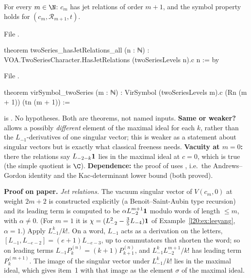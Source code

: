 \begin{theorem}\label{l20:thm:virinputs}
For every $m\in\N$: $c_m$ has jet relations of order $m+1$, and the symbol property holds for $(c_m,\mathcal R_{m+1},t)$.
\end{theorem}
\noindent File .
\begin{leancode}
theorem twoSeries_hasJetRelations_all (n : ℕ) :
    VOA.TwoSeriesCharacter.HasJetRelations (twoSeriesLevels n).c n := by
\end{leancode}
\noindent File .
\begin{leancode}
theorem virSymbol_twoSeries (m : ℕ) :
    VirSymbol (twoSeriesLevels m).c (Rn (m + 1)) (tn (m + 1)) :=
\end{leancode}

\begin{dictionary}
 is . No hypotheses. Both are theorems, not named inputs. \textbf{Same or weaker?}  allows a possibly \emph{different} element of the maximal ideal for each
$k$, rather than the $L_{-1}$-derivatives of one singular vector; this is weaker as a statement about singular vectors but is exactly
what classical freeness needs. \textbf{Vacuity at $m=0$:} there the relations say $L_{-2-k}\mathbf{1}$ lies in the maximal ideal at
$c=0$, which is true (the simple quotient is $\C$). \textbf{Dependence:} the proof of  uses
, i.e.\ the Andrews--Gordon identity and the Kac-determinant lower bound (both proved).
\end{dictionary}

\textbf{Proof on paper.} \emph{Jet relations.} The vacuum singular vector of $V(c_m,0)$ at weight $2m+2$ is constructed
explicitly (a Benoit--Saint-Aubin type recursion) and its leading term is computed to be $\alpha L_{-2}^{m+1}\mathbf{1}$ modulo
words of length $\le m$, with $\alpha\ne0$. (For $m=1$ it is $\chi=(L_{-2}^2-\frac35L_{-4})\mathbf{1}$ of Example~\ref{l20:ex:leeyang},
$\alpha=1$.) Apply $L_{-1}^k/k!$. On a word, $L_{-1}$ acts as a derivation on the letters, $[L_{-1},L_{-e-2}]=(e+1)L_{-e-3}$, up to
commutators that shorten the word; so on leading terms $L_{-1}P^{(n)}_k=(k+1)P^{(n)}_{k+1}$, and $L_{-1}^kL_{-2}^{m+1}/k!$ has leading
term $P^{(m+1)}_k$. The image of the singular vector under $L_{-1}^k/k!$ lies in the maximal ideal, which gives item~1 with that
image as the element $\sigma$ of the maximal ideal.

